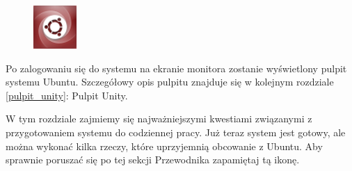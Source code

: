 \begin{figure}
	\includegraphics[width=\linewidth]{images/ikony_dash.png}
\end{figure}

Po zalogowaniu się do systemu na ekranie monitora zostanie wyświetlony pulpit systemu Ubuntu. Szczegółowy opis pulpitu znajduje się w kolejnym rozdziale \ref{pulpit_unity}: Pulpit Unity.

W tym rozdziale zajmiemy się najważniejszymi kwestiami związanymi z przygotowaniem systemu do codziennej pracy. Już teraz system jest gotowy, ale można wykonać kilka rzeczy, które uprzyjemnią obcowanie z Ubuntu. Aby sprawnie poruszać się po tej sekcji Przewodnika zapamiętaj tą ikonę.

\clearpage